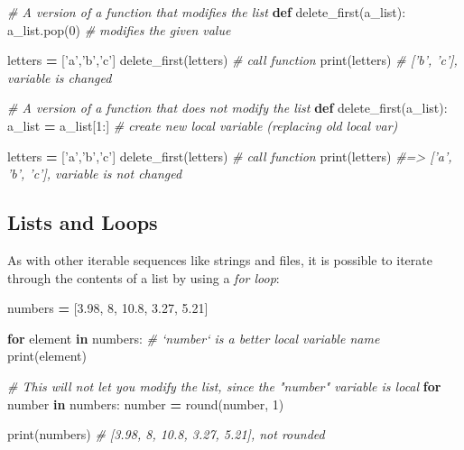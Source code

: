 \documentclass[]{book}
\newenvironment{Shaded}{\begin{snugshade}}{\end{snugshade}}
\newcommand{\KeywordTok}[1]{\textcolor[rgb]{0.13,0.29,0.53}{\textbf{#1}}}
\newcommand{\DecValTok}[1]{\textcolor[rgb]{0.00,0.00,0.81}{#1}}
\newcommand{\FloatTok}[1]{\textcolor[rgb]{0.00,0.00,0.81}{#1}}
\newcommand{\StringTok}[1]{\textcolor[rgb]{0.31,0.60,0.02}{#1}}
\newcommand{\CommentTok}[1]{\textcolor[rgb]{0.56,0.35,0.01}{\textit{#1}}}
\newcommand{\ControlFlowTok}[1]{\textcolor[rgb]{0.13,0.29,0.53}{\textbf{#1}}}
\newcommand{\OperatorTok}[1]{\textcolor[rgb]{0.81,0.36,0.00}{\textbf{#1}}}
\newcommand{\BuiltInTok}[1]{#1}
\newcommand{\NormalTok}[1]{#1}
\begin{document}
\begin{Shaded}
\begin{Highlighting}[]
\CommentTok{# A version of a function that modifies the list}
\KeywordTok{def}\NormalTok{ delete_first(a_list):}
\NormalTok{    a_list.pop(}\DecValTok{0}\NormalTok{)  }\CommentTok{# modifies the given value}

\NormalTok{letters }\OperatorTok{=}\NormalTok{ [}\StringTok{'a'}\NormalTok{,}\StringTok{'b'}\NormalTok{,}\StringTok{'c'}\NormalTok{]}
\NormalTok{delete_first(letters)  }\CommentTok{# call function}
\BuiltInTok{print}\NormalTok{(letters)  }\CommentTok{# ['b', 'c'], variable is changed}

\CommentTok{# A version of a function that does not modify the list}
\KeywordTok{def}\NormalTok{ delete_first(a_list):}
\NormalTok{    a_list }\OperatorTok{=}\NormalTok{ a_list[}\DecValTok{1}\NormalTok{:]  }\CommentTok{# create new local variable (replacing old local var)}

\NormalTok{letters }\OperatorTok{=}\NormalTok{ [}\StringTok{'a'}\NormalTok{,}\StringTok{'b'}\NormalTok{,}\StringTok{'c'}\NormalTok{]}
\NormalTok{delete_first(letters)  }\CommentTok{# call function}
\BuiltInTok{print}\NormalTok{(letters) }\CommentTok{#=> ['a', 'b', 'c'], variable is not changed}
\end{Highlighting}
\end{Shaded}

\hypertarget{lists-and-loops}{\subsection{Lists and
Loops}\label{lists-and-loops}}

As with other iterable sequences like strings and files, it is possible
to iterate through the contents of a list by using a \emph{for loop}:

\begin{Shaded}
\begin{Highlighting}[]
\NormalTok{numbers }\OperatorTok{=}\NormalTok{ [}\FloatTok{3.98}\NormalTok{, }\DecValTok{8}\NormalTok{, }\FloatTok{10.8}\NormalTok{, }\FloatTok{3.27}\NormalTok{, }\FloatTok{5.21}\NormalTok{]}

\ControlFlowTok{for}\NormalTok{ element }\KeywordTok{in}\NormalTok{ numbers:  }\CommentTok{# `number` is a better local variable name}
    \BuiltInTok{print}\NormalTok{(element)}

\CommentTok{# This will not let you modify the list, since the "number" variable is local}
\ControlFlowTok{for}\NormalTok{ number }\KeywordTok{in}\NormalTok{ numbers:}
\NormalTok{  number }\OperatorTok{=} \BuiltInTok{round}\NormalTok{(number, }\DecValTok{1}\NormalTok{)}

\BuiltInTok{print}\NormalTok{(numbers)  }\CommentTok{# [3.98, 8, 10.8, 3.27, 5.21], not rounded}
\end{Highlighting}
\end{Shaded}
\end{document}
